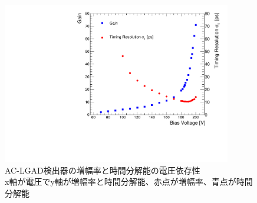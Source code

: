 \begin{figure}[H]
    \centering
    \includegraphics[width=10cm]{fig/graph/Gain_TresovsVoltage_APD.pdf}
    \caption[AC-LGAD検出器の増幅率と時間分解能の電圧依存性]{AC-LGAD検出器の増幅率と時間分解能の電圧依存性\\x軸が電圧でy軸が増幅率と時間分解能、赤点が増幅率、青点が時間分解能}
    \label{fg:Gain_TresovsBias}
\end{figure}
